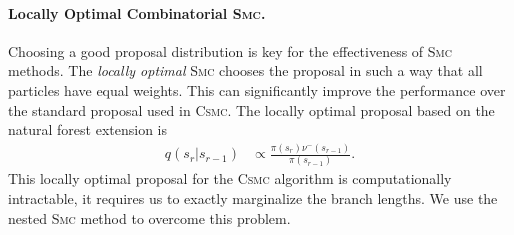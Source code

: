 \documentclass[accepted]{uai2021} %
\theoremstyle{definition}
\begin{document}



\paragraph{Locally Optimal Combinatorial \textsc{Smc}.} 
Choosing a good proposal distribution is key for the effectiveness of \textsc{Smc} methods. The \emph{locally optimal} \textsc{Smc} \citep{doucet2000sequential,naesseth2019elements} chooses the proposal in such a way that all particles have equal weights. This can significantly improve the performance over the standard proposal used in \textsc{Csmc}. The locally optimal proposal based on the natural forest extension is
\begin{align}
    q(s_r  | s_{r-1}) &\propto \frac{\pi(s_r) \nu^-(s_{r-1})}{\pi(s_{r-1})}.
\end{align}
This locally optimal proposal for the \textsc{Csmc} algorithm is computationally intractable, it requires us to exactly marginalize the branch lengths. We use the nested \textsc{Smc} \citep{naesseth2015nested,naesseth2016high} method to overcome this problem.
\end{document}
